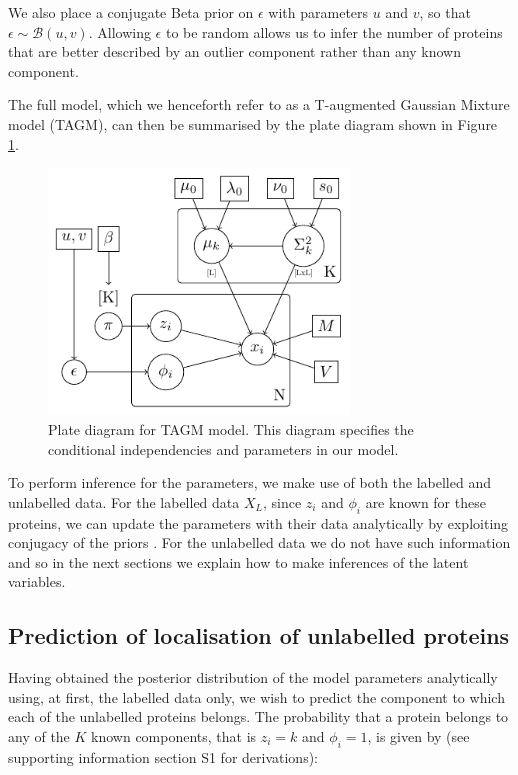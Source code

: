 \documentclass[12pt,english]{article}\usepackage[]{graphicx}\usepackage[]{color}
\begin{document}
We also place a conjugate Beta prior on $\epsilon$ with parameters $u$
and $v$, so that $\epsilon \sim \mathcal{B}(u,v)$.  Allowing
$\epsilon$ to be random allows us to infer the number of proteins that
are better described by an outlier component rather than any known
component.

The full model, which we henceforth refer to as a T-augmented Gaussian
Mixture model (TAGM), can then be summarised by the plate diagram
shown in Figure \ref{plateDiagram}.

\begin{figure}[p]
  \includegraphics[width=8cm]{graphmodel2.pdf}
  \centering
  \caption{Plate diagram for TAGM model. This diagram specifies the
    conditional independencies and parameters in our
    model.}\label{plateDiagram}
\end{figure}

To perform inference for the parameters, we make use of both the
labelled and unlabelled data. For the labelled data $X_L$, since $z_i$
and $\phi_i$ are known for these proteins, we can update the
parameters with their data analytically by exploiting conjugacy of the
priors \citep[see, for example,][]{Gelman:1995}. For the unlabelled
data we do not have such information and so in the next sections we
explain how to make inferences of the latent variables.

\subsection*{Prediction of localisation of unlabelled proteins}

Having obtained the posterior distribution of the model parameters
analytically using, at first, the labelled data only, we wish to
predict the component to which each of the unlabelled proteins
belongs. The probability that a protein belongs to any of the $K$
known components, that is $z_i = k$ and $\phi_i = 1$, is given by (see
supporting information section S1 for derivations):
\end{document}
